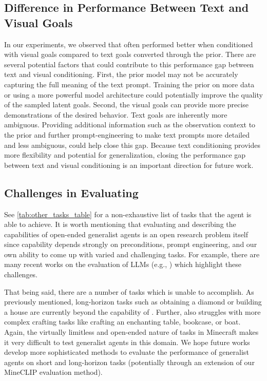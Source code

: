 \subsection{Difference in Performance Between Text and Visual Goals}
In our experiments, we observed that \agentname{} often performed better when conditioned with visual goals compared to text goals converted through the prior. There are several potential factors that could contribute to this performance gap between text and visual conditioning. First, the prior model may not be accurately capturing the full meaning of the text prompt. Training the prior on more data or using a more powerful model architecture could potentially improve the quality of the sampled latent goals. Second, the visual goals can provide more precise demonstrations of the desired behavior. Text goals are inherently more ambiguous. Providing additional information such as the observation context to the prior and further prompt-engineering to make text prompts more detailed and less ambiguous, could help close this gap. Because text conditioning provides more flexibility and potential for generalization, closing the performance gap between text and visual conditioning is an important direction for future work.


\subsection{Challenges in Evaluating \agentname{}}
\label{appx:challenges_in_eval}

See \autoref{tab:other_tasks_table} for a non-exhaustive  list of tasks that the \agentname{} agent is able to achieve. It is worth mentioning that evaluating and describing the capabilities of open-ended generalist agents is an open research problem itself since capability depends strongly on preconditions, prompt engineering, and our own ability to come up with varied and challenging tasks. For example, there are many recent works on the evaluation of LLMs (e.g., \citep{helm, alpaca_eval, zheng2023judging}) which highlight these challenges.

That being said, there are a number of tasks which \agentname{} is unable to accomplish. As previously mentioned, long-horizon tasks such as obtaining a diamond or building a house are currently beyond the capability of \agentname{}. Further, \agentname{} also struggles with more complex crafting tasks like crafting an enchanting table, bookcase, or boat. Again, the virtually limitless and open-ended nature of tasks in Minecraft makes it very difficult to test generalist agents in this domain. We hope future works develop more sophisticated methods to evaluate the performance of generalist agents on short and long-horizon tasks (potentially through an extension of our MineCLIP evaluation method).

